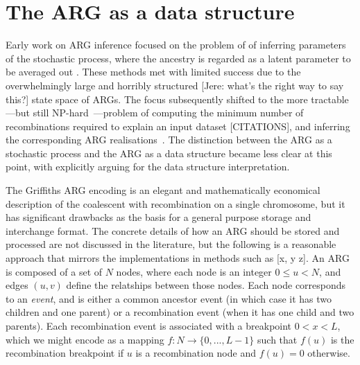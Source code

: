 \documentclass{article}
\begin{document}
\section*{The ARG as a data structure}
Early work on ARG inference focused on the problem of
of inferring parameters of the
stochastic process, where the ancestry is regarded as a
latent parameter to be averaged out
\citep[e.g.][]{griffiths1996ancestral,kuhner2000maximum, nielsen2000estimation,
fearnhead2001estimating}. These methods met with limited success
due to the overwhelmingly large and
horribly structured [Jere: what's the right way to say this?]
state space of ARGs. The focus subsequently shifted to
the more tractable---but still
NP-hard~\citep{wang2001perfect}---problem of computing
the minimum number of recombinations required
to explain an input dataset [CITATIONS], and inferring the corresponding
ARG realisations~\citep{song2003parsimonious,song2005efficient,lyngso2005minimum}.
The distinction between the ARG as a stochastic process
and the ARG as a data structure became less clear at this point,
with \citet{minichiello2006mapping} explicitly arguing for
the data structure interpretation.

The Griffiths ARG encoding is an elegant and mathematically
economical description of the coalescent with recombination on a single
chromosome, but it has significant drawbacks as the basis for a general purpose
storage and interchange format.
The concrete details of how an ARG should be stored and processed
are not discussed in the literature, %
but the following is a reasonable approach that mirrors the implementations
in methods such as [x, y z].
An ARG is composed of a set of $N$ nodes, where each node is an
integer $0 \leq u < N$, and edges $(u, v)$ define the relatships between
those nodes.
Each node corresponds to an \emph{event}, and is either a common ancestor
event (in which case it has two children and one parent)
or a recombination event (when it has one child and two parents).
Each recombination event is associated with a breakpoint $0 < x < L$,
which we might encode as a mapping $f: N \rightarrow \{0, ..., L - 1\}$
such that $f(u)$ is the recombination breakpoint if $u$ is a recombination
node and $f(u) = 0$ otherwise.
\end{document}

